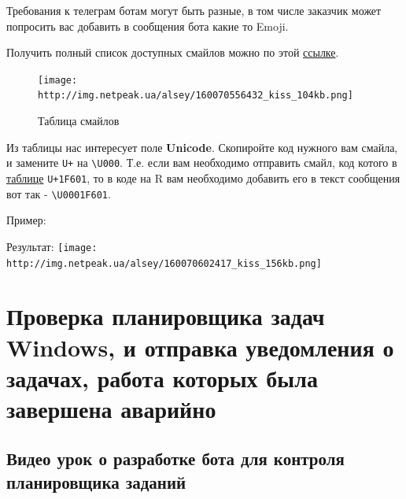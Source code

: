 \documentclass[
]{book}
\newenvironment{Shaded}{\begin{snugshade}}{\end{snugshade}}
\newcommand{\FunctionTok}[1]{\textcolor[rgb]{0.13,0.29,0.53}{\textbf{#1}}}
\newcommand{\NormalTok}[1]{#1}
\newcommand{\SpecialCharTok}[1]{\textcolor[rgb]{0.81,0.36,0.00}{\textbf{#1}}}
\newcommand{\StringTok}[1]{\textcolor[rgb]{0.31,0.60,0.02}{#1}}
\begin{document}
Требования к телеграм ботам могут быть разные, в том числе заказчик может попросить вас добавить в сообщения бота какие то Emoji.

Получить полный список доступных смайлов можно по этой \href{https://apps.timwhitlock.info/emoji/tables/unicode}{ссылке}.

\begin{figure}
\centering
\texttt{[image: http://img.netpeak.ua/alsey/160070556432\_kiss\_104kb.png]}
\caption{Таблица смайлов}
\end{figure}

Из таблицы нас интересует поле \textbf{Unicode}. Скопиройте код нужного вам смайла, и замените \texttt{U+} на \texttt{\textbackslash{}U000}. Т.е. если вам необходимо отправить смайл, код котого в \href{https://apps.timwhitlock.info/emoji/tables/unicode}{таблице} \texttt{U+1F601}, то в коде на R вам необходимо добавить его в текст сообщения вот так - \texttt{\textbackslash{}U0001F601}.

Пример:

\begin{Shaded}
\end{Shaded}

Результат:
\texttt{[image: http://img.netpeak.ua/alsey/160070602417\_kiss\_156kb.png]}

\section{Проверка планировщика задач Windows, и отправка уведомления о задачах, работа которых была завершена аварийно}\label{ux43fux440ux43eux432ux435ux440ux43aux430-ux43fux43bux430ux43dux438ux440ux43eux432ux449ux438ux43aux430-ux437ux430ux434ux430ux447-windows-ux438-ux43eux442ux43fux440ux430ux432ux43aux430-ux443ux432ux435ux434ux43eux43cux43bux435ux43dux438ux44f-ux43e-ux437ux430ux434ux430ux447ux430ux445-ux440ux430ux431ux43eux442ux430-ux43aux43eux442ux43eux440ux44bux445-ux431ux44bux43bux430-ux437ux430ux432ux435ux440ux448ux435ux43dux430-ux430ux432ux430ux440ux438ux439ux43dux43e}

\subsection{Видео урок о разработке бота для контроля планировщика заданий}\label{ux432ux438ux434ux435ux43e-ux443ux440ux43eux43a-ux43e-ux440ux430ux437ux440ux430ux431ux43eux442ux43aux435-ux431ux43eux442ux430-ux434ux43bux44f-ux43aux43eux43dux442ux440ux43eux43bux44f-ux43fux43bux430ux43dux438ux440ux43eux432ux449ux438ux43aux430-ux437ux430ux434ux430ux43dux438ux439}
\end{document}
